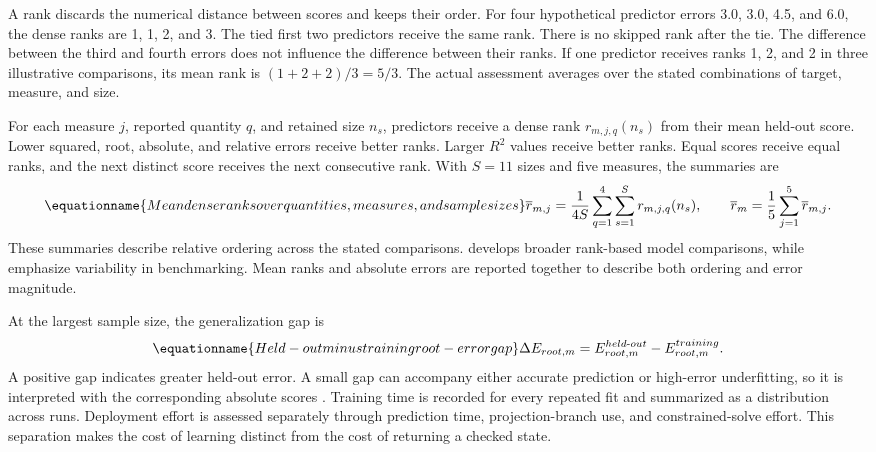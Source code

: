 A rank discards the numerical distance between scores and keeps their order. For four hypothetical predictor errors 3.0, 3.0, 4.5, and 6.0, the dense ranks are 1, 1, 2, and 3. The tied first two predictors receive the same rank. There is no skipped rank after the tie. The difference between the third and fourth errors does not influence the difference between their ranks. If one predictor receives ranks 1, 2, and 2 in three illustrative comparisons, its mean rank is \((1+2+2)/3=5/3\). The actual assessment averages over the stated combinations of target, measure, and size.

For each measure \(j\), reported quantity \(q\), and retained size \(n_s\), predictors receive a dense rank \(r_{m,j,q}(n_s)\) from their mean held-out score. Lower squared, root, absolute, and relative errors receive better ranks. Larger \(R^2\) values receive better ranks. Equal scores receive equal ranks, and the next distinct score receives the next consecutive rank. With \(S=11\) sizes and five measures, the summaries are
\begin{equation}
\equationname{Mean dense ranks over quantities, measures, and sample sizes}
\label{eq:icsor_dense_rank}
\overline r_{m,j}=\frac{1}{4S}\sum_{q=1}^{4}\sum_{s=1}^{S}r_{m,j,q}(n_s),
\qquad
\overline r_m=\frac{1}{5}\sum_{j=1}^{5}\overline r_{m,j}.
\end{equation}
These summaries describe relative ordering across the stated comparisons. \citet{Demsar2006} develops broader rank-based model comparisons, while \citet{Shevchenko2024} emphasize variability in benchmarking. Mean ranks and absolute errors are reported together to describe both ordering and error magnitude.

At the largest sample size, the generalization gap is
\begin{equation}
\equationname{Held-out minus training root-error gap}
\label{eq:icsor_generalization_gap}
\Delta E_{root,m}=E_{root,m}^{held\text{-}out}-E_{root,m}^{training}.
\end{equation}
A positive gap indicates greater held-out error. A small gap can accompany either accurate prediction or high-error underfitting, so it is interpreted with the corresponding absolute scores \citep{Hastie2009}. Training time is recorded for every repeated fit and summarized as a distribution across runs. Deployment effort is assessed separately through prediction time, projection-branch use, and constrained-solve effort. This separation makes the cost of learning distinct from the cost of returning a checked state.

